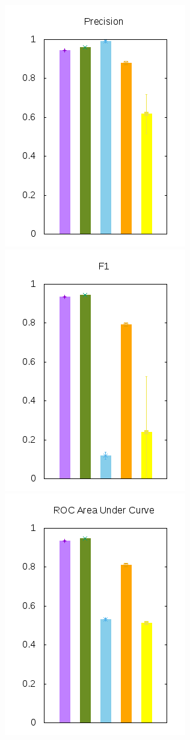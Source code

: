 \documentclass[10pt, a4paper]{article}
\begin{document}
\begin{figure}[H]
  \begin{minipage}{1\textwidth}
	\includegraphics[scale=0.5]{../src/data/pr.png}
	\includegraphics[scale=0.5]{../src/data/f1.png}
	\includegraphics[scale=0.5]{../src/data/ro.png}
  \end{minipage}
\end{figure}
\end{document}
